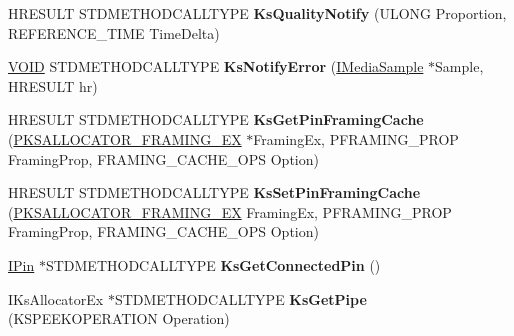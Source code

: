 \begin{DoxyCompactItemize}
\item 
\mbox{\label{class_c_output_pin_afd2e238df9492a7a766e8e6e8e609063}} 
H\+R\+E\+S\+U\+LT S\+T\+D\+M\+E\+T\+H\+O\+D\+C\+A\+L\+L\+T\+Y\+PE {\bfseries Ks\+Quality\+Notify} (U\+L\+O\+NG Proportion, R\+E\+F\+E\+R\+E\+N\+C\+E\+\_\+\+T\+I\+ME Time\+Delta)
\item 
\mbox{\label{class_c_output_pin_aaa868538ff7a9c48b0e27458729946cf}} 
\hyperlink{interfacevoid}{V\+O\+ID} S\+T\+D\+M\+E\+T\+H\+O\+D\+C\+A\+L\+L\+T\+Y\+PE {\bfseries Ks\+Notify\+Error} (\hyperlink{interface_i_media_sample}{I\+Media\+Sample} $\ast$Sample, H\+R\+E\+S\+U\+LT hr)
\item 
\mbox{\label{class_c_output_pin_a949d93e119ee79d4687a749928c50bc5}} 
H\+R\+E\+S\+U\+LT S\+T\+D\+M\+E\+T\+H\+O\+D\+C\+A\+L\+L\+T\+Y\+PE {\bfseries Ks\+Get\+Pin\+Framing\+Cache} (\hyperlink{struct_k_s_a_l_l_o_c_a_t_o_r___f_r_a_m_i_n_g___e_x}{P\+K\+S\+A\+L\+L\+O\+C\+A\+T\+O\+R\+\_\+\+F\+R\+A\+M\+I\+N\+G\+\_\+\+EX} $\ast$Framing\+Ex, P\+F\+R\+A\+M\+I\+N\+G\+\_\+\+P\+R\+OP Framing\+Prop, F\+R\+A\+M\+I\+N\+G\+\_\+\+C\+A\+C\+H\+E\+\_\+\+O\+PS Option)
\item 
\mbox{\label{class_c_output_pin_a897ac7af281148aa9027358debccd0a3}} 
H\+R\+E\+S\+U\+LT S\+T\+D\+M\+E\+T\+H\+O\+D\+C\+A\+L\+L\+T\+Y\+PE {\bfseries Ks\+Set\+Pin\+Framing\+Cache} (\hyperlink{struct_k_s_a_l_l_o_c_a_t_o_r___f_r_a_m_i_n_g___e_x}{P\+K\+S\+A\+L\+L\+O\+C\+A\+T\+O\+R\+\_\+\+F\+R\+A\+M\+I\+N\+G\+\_\+\+EX} Framing\+Ex, P\+F\+R\+A\+M\+I\+N\+G\+\_\+\+P\+R\+OP Framing\+Prop, F\+R\+A\+M\+I\+N\+G\+\_\+\+C\+A\+C\+H\+E\+\_\+\+O\+PS Option)
\item 
\mbox{\label{class_c_output_pin_a7caeb79cc63e2d4e9c79a545e146a0aa}} 
\hyperlink{interface_i_pin}{I\+Pin} $\ast$S\+T\+D\+M\+E\+T\+H\+O\+D\+C\+A\+L\+L\+T\+Y\+PE {\bfseries Ks\+Get\+Connected\+Pin} ()
\item 
\mbox{\label{class_c_output_pin_af1180d5f4197fb5ea955b05df2e5670f}} 
I\+Ks\+Allocator\+Ex $\ast$S\+T\+D\+M\+E\+T\+H\+O\+D\+C\+A\+L\+L\+T\+Y\+PE {\bfseries Ks\+Get\+Pipe} (K\+S\+P\+E\+E\+K\+O\+P\+E\+R\+A\+T\+I\+ON Operation)
\item 
\mbox{\label{class_c_output_pin_a20d3029cb7c5adf3fbe19beb5869d09a}} 

\end{DoxyCompactItemize}
